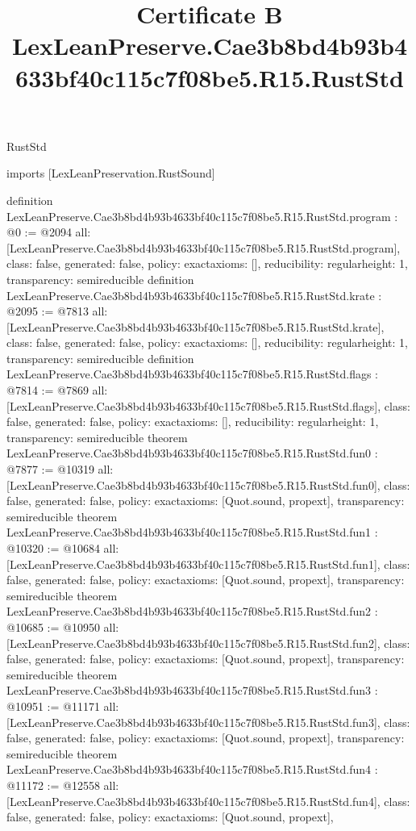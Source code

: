 \begin{lexlean}{RustStd}
\title{Certificate B LexLeanPreserve.Cae3b8bd4b93b4633bf40c115c7f08be5.R15.RustStd}
\begin{coremodule}
imports [LexLeanPreservation.RustSound]

definition LexLeanPreserve.Cae3b8bd4b93b4633bf40c115c7f08be5.R15.RustStd.program : @0 := @2094 {
  all: [LexLeanPreserve.Cae3b8bd4b93b4633bf40c115c7f08be5.R15.RustStd.program],
  class: false,
  generated: false,
  policy: exact{axioms: []},
  reducibility: regular{height: 1},
  transparency: semireducible
}
definition LexLeanPreserve.Cae3b8bd4b93b4633bf40c115c7f08be5.R15.RustStd.krate : @2095 := @7813 {
  all: [LexLeanPreserve.Cae3b8bd4b93b4633bf40c115c7f08be5.R15.RustStd.krate],
  class: false,
  generated: false,
  policy: exact{axioms: []},
  reducibility: regular{height: 1},
  transparency: semireducible
}
definition LexLeanPreserve.Cae3b8bd4b93b4633bf40c115c7f08be5.R15.RustStd.flags : @7814 := @7869 {
  all: [LexLeanPreserve.Cae3b8bd4b93b4633bf40c115c7f08be5.R15.RustStd.flags],
  class: false,
  generated: false,
  policy: exact{axioms: []},
  reducibility: regular{height: 1},
  transparency: semireducible
}
theorem LexLeanPreserve.Cae3b8bd4b93b4633bf40c115c7f08be5.R15.RustStd.fun0 : @7877 := @10319 {
  all: [LexLeanPreserve.Cae3b8bd4b93b4633bf40c115c7f08be5.R15.RustStd.fun0],
  class: false,
  generated: false,
  policy: exact{axioms: [Quot.sound, propext]},
  transparency: semireducible
}
theorem LexLeanPreserve.Cae3b8bd4b93b4633bf40c115c7f08be5.R15.RustStd.fun1 : @10320 := @10684 {
  all: [LexLeanPreserve.Cae3b8bd4b93b4633bf40c115c7f08be5.R15.RustStd.fun1],
  class: false,
  generated: false,
  policy: exact{axioms: [Quot.sound, propext]},
  transparency: semireducible
}
theorem LexLeanPreserve.Cae3b8bd4b93b4633bf40c115c7f08be5.R15.RustStd.fun2 : @10685 := @10950 {
  all: [LexLeanPreserve.Cae3b8bd4b93b4633bf40c115c7f08be5.R15.RustStd.fun2],
  class: false,
  generated: false,
  policy: exact{axioms: [Quot.sound, propext]},
  transparency: semireducible
}
theorem LexLeanPreserve.Cae3b8bd4b93b4633bf40c115c7f08be5.R15.RustStd.fun3 : @10951 := @11171 {
  all: [LexLeanPreserve.Cae3b8bd4b93b4633bf40c115c7f08be5.R15.RustStd.fun3],
  class: false,
  generated: false,
  policy: exact{axioms: [Quot.sound, propext]},
  transparency: semireducible
}
theorem LexLeanPreserve.Cae3b8bd4b93b4633bf40c115c7f08be5.R15.RustStd.fun4 : @11172 := @12558 {
  all: [LexLeanPreserve.Cae3b8bd4b93b4633bf40c115c7f08be5.R15.RustStd.fun4],
  class: false,
  generated: false,
  policy: exact{axioms: [Quot.sound, propext]},
}
\end{coremodule}
\end{lexlean}
